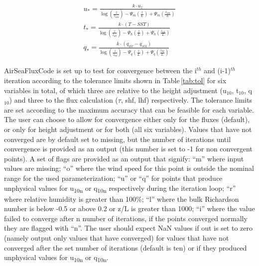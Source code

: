 \documentclass[letterpaper,10pt,english]{sphinxmanual}
\begin{document}
\begin{equation}
   \begin{array}{l}
     u_{\ast} = \frac{k\cdot u_{z}}{\log(\frac{z}{z_{om}})-\Psi_{m}(\frac{z}{L})+\Psi_{m}(\frac{z_{om}}{L})} \\
     t_{\ast} = \frac{k\cdot (T-SST)}{\log(\frac{z}{z_{oh}})-\Psi_{h}(\frac{z}{L})+\Psi_{h}(\frac{z_{oh}}{L})} \\
     q_{\ast} = \frac{k\cdot (q_{air}-q_{sea})}{\log(\frac{z}{z_{oq}})-\Psi_{q}(\frac{z}{L})+\Psi_{q}(\frac{z_{oq}}{L})} 
   \end{array}
    \label{eq:strs}
\end{equation}

AirSeaFluxCode is set up to test for convergence between the i$^{th}$ and (i-1)$^{th}$ iteration according to the tolerance limits shown in Table\,\ref{tab:tol} for six variables in total, of which three are relative to the height adjustment (u$_{10}$, t$_{10}$, q$_{10}$) and three to the flux calculation ($\tau$, shf, lhf) respectively. The tolerance limits are set according to the maximum accuracy that can be feasible for each variable. The user can choose to allow for convergence either only for the fluxes (default), or only for height adjustment or for both (all six variables). Values that have not converged are by default set to missing, but the number of iterations until convergence is provided as an output (this number is set to -1 for non convergent points).
A set of flags are provided as an output that signify: ``m'' where input values are missing; ``o'' where the wind speed for this point is outside the nominal range for the used parameterization; ``u'' or ``q'' for points that produce unphysical values for u\textsubscript{10n} or q\textsubscript{10n} respectively during the iteration loop; ``r'' where relative humidity is greater than 100\%; ``l'' where the bulk Richardson number is below -0.5 or above 0.2 or z/L is greater than 1000; ``i'' where the value failed to converge after n number of iterations, if the points converged normally they are flagged with ``n''. The user should expect NaN values if out is set to zero (namely output only values that have converged) for values that have not converged after the set number of iterations (default is ten) or if they produced unphysical values for u\textsubscript{10n} or q\textsubscript{10n}.
\end{document}
